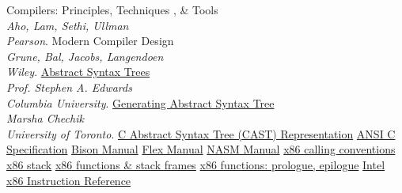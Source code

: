 \documentclass[a4paper,10pt]{article}
\begin{document}
\renewcommand\refname{\vspace{-10mm}}
\begin{thebibliography}{00}
	Compilers: Principles, Techniques , \& Tools\\\emph{Aho, Lam, Sethi, Ullman}\\ \emph{Pearson}.
	Modern Compiler Design\\\emph{Grune, Bal, Jacobs, Langendoen}\\ \emph{Wiley}.
	 \href{http://www1.cs.columbia.edu/~sedwards/classes/2003/w4115f/ast.9up.pdf}{Abstract Syntax Trees}\\\emph{Prof. Stephen A. Edwards}\\ \emph{Columbia University}.
	 \href{http://www.cs.toronto.edu/~chechik/courses97/csc488/ast.html}{Generating Abstract Syntax Tree}\\\emph{Marsha Chechik}\\ \emph{University of Toronto}.
	 \href{http://www.cs.utah.edu/flux/flick/current/doc/guts/gutsch6.html}{C Abstract Syntax Tree (CAST) Representation}
		\href{http://eli-project.sourceforge.net/c\_html/c.html}{ANSI C Specification}
	 \href{http://www.gnu.org/software/bison/manual/bison.html}{Bison Manual}
	 \href{http://flex.sourceforge.net/manual/}{Flex Manual}
	 \href{http://www.nasm.us/doc/nasmdoci.html}{NASM Manual}
	 \href{http://en.wikipedia.org/wiki/X86_calling_conventions}{x86 calling conventions}
	 \href{http://en.wikibooks.org/wiki/X86_Disassembly/The_Stack}{x86 stack}
	 \href{http://en.wikibooks.org/wiki/X86_Disassembly/Functions_and_Stack_Frames}{x86 functions \& stack frames}
	 \href{http://en.wikipedia.org/wiki/Function_prologue}{x86 functions: prologue, epilogue}
	 \href{http://www.posix.nl/linuxassembly/nasmdochtml/nasmdoca.html}{Intel x86 Instruction Reference}
	

\end{thebibliography}
\end{document}
